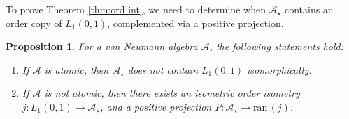\documentclass[12pt]{amsart}
\theoremstyle{plain}
\newtheorem{proposition}[theorem]{Proposition}
\theoremstyle{definition}
\newcommand{\A}{\mathcal{A}}
\def \ran{{\mathrm{ran}} \, }
\begin{document}
To prove Theorem \ref{thm:ord int}, we need to determine when $\A_\star$ contains
an order copy of $L_1(0,1)$, complemented via a positive projection.

\begin{proposition}\label{prop:compl L1}
For a von Neumann algebra $\A$, the following statements hold:
\begin{enumerate}
\item 
If $\A$ is atomic, then $\A_\star$ does not contain $L_1(0,1)$ isomorphically.
\item
If $\A$ is not atomic, then there exists an isometric order isometry
$j : L_1(0,1) \to \A_\star$, and a positive projection
$P : \A_\star \to \ran(j)$.
\end{enumerate}
\end{proposition}
\end{document}
